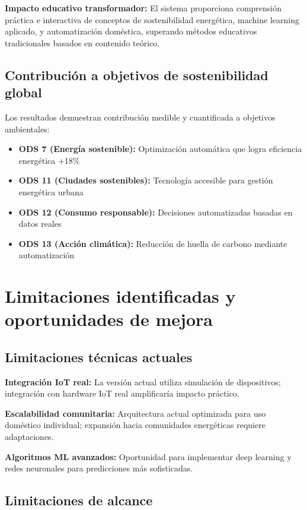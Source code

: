 \textbf{Impacto educativo transformador:} El sistema proporciona comprensión práctica e interactiva de conceptos de sostenibilidad energética, machine learning aplicado, y automatización doméstica, superando métodos educativos tradicionales basados en contenido teórico.

\subsection{Contribución a objetivos de sostenibilidad global}

Los resultados demuestran contribución medible y cuantificada a objetivos ambientales:

\begin{itemize}
    \item \textbf{ODS 7 (Energía sostenible):} Optimización automática que logra eficiencia energética +18\%
    \item \textbf{ODS 11 (Ciudades sostenibles):} Tecnología accesible para gestión energética urbana
    \item \textbf{ODS 12 (Consumo responsable):} Decisiones automatizadas basadas en datos reales
    \item \textbf{ODS 13 (Acción climática):} Reducción de huella de carbono mediante automatización
\end{itemize}

\section{Limitaciones identificadas y oportunidades de mejora}

\subsection{Limitaciones técnicas actuales}

\textbf{Integración IoT real:} La versión actual utiliza simulación de dispositivos; integración con hardware IoT real amplificaría impacto práctico.

\textbf{Escalabilidad comunitaria:} Arquitectura actual optimizada para uso doméstico individual; expansión hacia comunidades energéticas requiere adaptaciones.

\textbf{Algoritmos ML avanzados:} Oportunidad para implementar deep learning y redes neuronales para predicciones más sofisticadas.

\subsection{Limitaciones de alcance}

